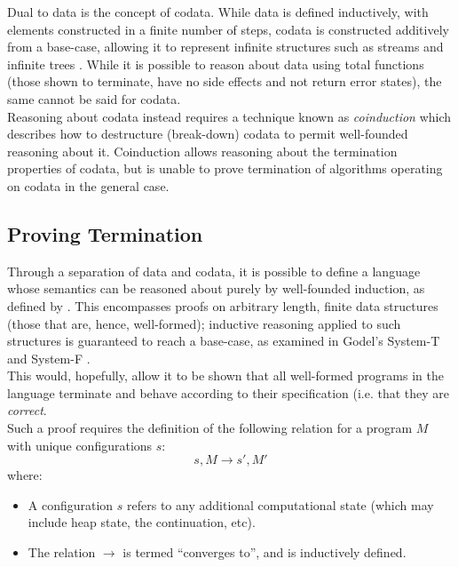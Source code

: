 Dual to data is the concept of codata.
While data is defined inductively, with elements constructed in a finite number of steps, codata is constructed additively from a base-case, allowing it to represent infinite structures such as streams and infinite trees \citep{hinze2010reasoning}.
While it is possible to reason about data using total functions (those shown to terminate, have no side effects and not return error states), the same cannot be said for codata.\\

Reasoning about codata instead requires a technique known as \textit{coinduction} which describes how to destructure (break-down) codata to permit well-founded reasoning about it. 
Coinduction allows reasoning about the termination properties of codata, but is unable to prove termination of algorithms operating on codata in the general case. 


\subsection{Proving Termination} %
\label{sub:proving_termination}
Through a separation of data and codata, it is possible to define a language whose semantics can be reasoned about purely by well-founded induction, as defined by \citet{nordstrom1988terminating}. 
This encompasses proofs on arbitrary length, finite data structures (those that are, hence, well-formed); inductive reasoning applied to such structures is guaranteed to reach a base-case, as examined in Godel's System-T and System-F \citep{alves2010godel,girard1989proofs}.\\

This would, hopefully, allow it to be shown that all well-formed programs in the language terminate and behave according to their specification (i.e. that they are \textit{correct}.\\

Such a proof requires the definition of the following relation for a program $M$ with unique configurations $s$:
\begin{equation*}
    s, M \rightarrow s', M'
\end{equation*}
where:
\begin{itemize}
    \item A configuration $s$ refers to any additional computational state (which may include heap state, the continuation, etc).
    \item The relation $\rightarrow$ is termed ``converges to'', and is inductively defined.
\end{itemize}

